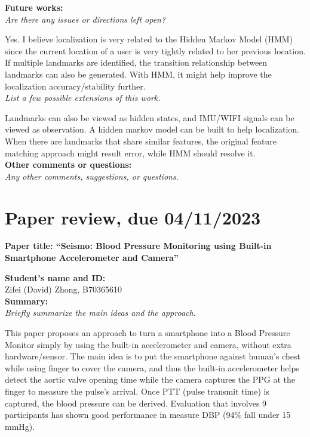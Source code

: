 \documentclass[11pt, oneside]{article}   	%
\begin{document}
\noindent \textbf{Future works:}\\
\emph{Are there any issues or directions left open?}

Yes. I believe localization is very related to the Hidden Markov Model (HMM) since the current location of a user is very tightly related to her previous location. If multiple landmarks are identified, the transition relationship between landmarks can also be generated. With HMM, it might help improve the localization accuracy/stability further.\\

\noindent \emph{List a few possible extensions of this work.}

Landmarks can also be viewed as hidden states, and IMU/WIFI signals can be viewed as observation. A hidden markov model can be built to help localization. When there are landmarks that share similar features, the original feature matching approach might result error, while HMM should resolve it. \\


\noindent \textbf{Other comments or questions:}\\
\emph{Any other comments, suggestions, or questions}.


\newpage
\section{Paper review, due 04/11/2023}
\begin{center}
\noindent
\textbf{\Large Paper title: ``Seismo: Blood Pressure Monitoring using Built-in Smartphone Accelerometer and Camera''}
\end{center}


\noindent \textbf{Student's name and ID: }\\
Zifei (David) Zhong, B70365610\\

\noindent \textbf{Summary:}\\
\emph{Briefly summarize the main ideas and the approach}.

This paper proposes an approach to turn a smartphone into a Blood Pressure Monitor simply by using the built-in accelerometer and camera, without extra hardware/sensor. The main idea is to put the smartphone against human's chest while using finger to cover the camera, and thus the built-in accelerometer helps detect the aortic valve opening time while the camera captures the PPG at the finger to measure the pulse's arrival. Once PTT (pulse transmit time) is captured, the blood pressure can be derived. Evaluation that involves 9 participants has shown good performance in measure DBP (94\% fall under 15 mmHg).\\
\end{document}
